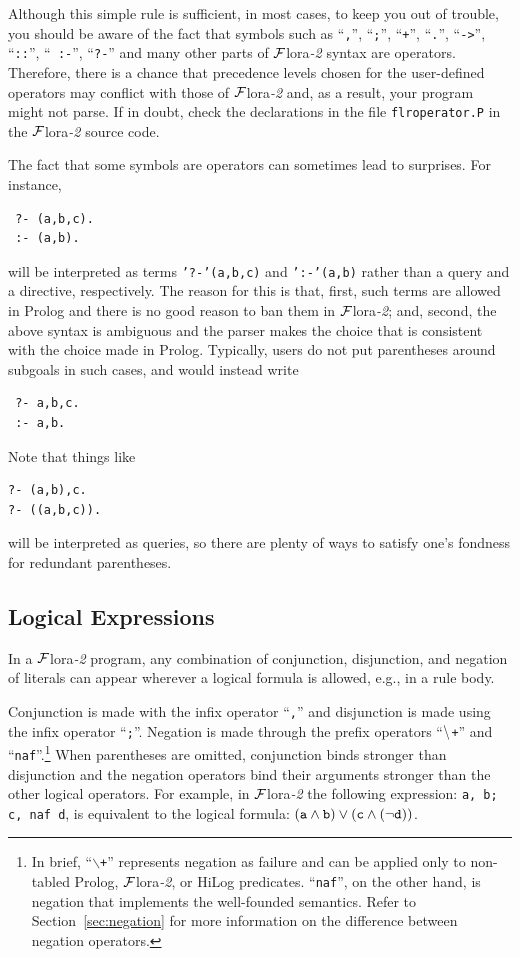 \documentclass[11pt]{article}
\newcommand{\FLORA}{{\mbox{\sc ${\cal F}${lora}\rm\emph{-2}}}\xspace}
\newcommand{\PLGNAF}{\mbox{\tt \ensuremath{\tt\backslash}+}\xspace}
\newcommand{\RULELOGNAF}{{{\tt naf}}\xspace}
\begin{document}
Although this simple rule is sufficient, in most cases, to keep you out of
trouble, you should be aware of the fact that symbols such as ``{\tt ,}'',
``{\tt ;}'', ``{\tt +}'', ``{\tt .}'', ``{\tt ->}'', ``{\tt ::}'', ``{\tt
  :-}'', ``{\tt ?-}'' and many
other parts of \FLORA syntax are operators. Therefore, there is a chance
that precedence levels chosen for the user-defined operators may conflict with
those of \FLORA and, as a result, your program might not parse. If in
doubt, check the declarations in the file {\tt flroperator.P} in the \FLORA
source code.

The fact that some symbols are operators can sometimes lead to
surprises. For instance,
\begin{verbatim}
 ?- (a,b,c).
 :- (a,b).
\end{verbatim}
will be interpreted as terms {\tt '?-'(a,b,c)} and {\tt ':-'(a,b)} rather
than a query and a directive, respectively. The reason for this is that,
first, such terms are allowed in Prolog and there is no good reason to ban
them in \FLORA; and, second, the above syntax is ambiguous and the parser
makes the choice that is consistent with the choice made in
Prolog. Typically, users do not put parentheses around subgoals in such
cases, and would instead write
\begin{verbatim}
 ?- a,b,c.
 :- a,b.  
\end{verbatim}
Note that things like
\begin{verbatim}
?- (a,b),c.  
?- ((a,b,c)).
\end{verbatim}
will be interpreted as queries, so there are plenty of ways to satisfy
one's fondness for redundant parentheses.


\subsection{Logical Expressions}


%
In a \FLORA program, any combination of conjunction, disjunction, and
negation of literals can appear wherever a logical formula is allowed,
e.g., in a rule body.

Conjunction is made with the infix operator ``{\tt ,}'' and
disjunction is made using the infix operator ``{\tt ;}''.  Negation is made
through the prefix operators ``\PLGNAF'' and ``\RULELOGNAF''.\footnote{
  In brief, ``{\tt $\backslash$+}'' represents negation as
  failure and can be applied only to non-tabled Prolog, \FLORA, or HiLog
  predicates. ``\RULELOGNAF'', on the other hand, is negation that
  implements the well-founded semantics.  Refer to
  Section~\ref{sec:negation} for more information on the difference between
  negation operators. 
  }
When parentheses are omitted, conjunction binds stronger than disjunction
and the negation operators bind their arguments stronger than the other
logical operators.  For example, in \FLORA the following expression:
{\tt a, b; c, \RULELOGNAF d}, is equivalent to the logical formula: $\tt (a
\wedge b) \vee (c \wedge (\neg d))$.
\end{document}
